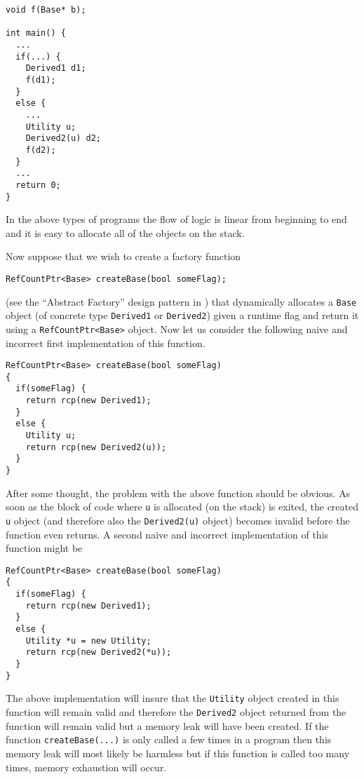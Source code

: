 {\scriptsize\begin{verbatim}
void f(Base* b);

int main() {
  ...
  if(...) {
    Derived1 d1;
    f(d1);
  }
  else {
    ...
    Utility u;
    Derived2(u) d2;
    f(d2);
  }
  ...
  return 0;
}
\end{verbatim}}

{}\noindent{}In the above types of programs the flow of logic is
linear from beginning to end and it is easy to allocate all of the
objects on the stack.

Now suppose that we wish to create a factory function

{\scriptsize\begin{verbatim}
RefCountPtr<Base> createBase(bool someFlag);
\end{verbatim}}

{}\indent{}(see the ``Abstract Factory'' design pattern in
{}\cite{ref:gama_et_al_1995}) that dynamically allocates a
{}\texttt{Base} object (of concrete type {}\texttt{Derived1} or
{}\texttt{Derived2}) given a runtime flag and return it using a
{}\texttt{RefCountPtr<Base>} object.  Now let us consider the
following naive and incorrect first implementation of this function.

{\scriptsize\begin{verbatim}
RefCountPtr<Base> createBase(bool someFlag)
{
  if(someFlag) {
    return rcp(new Derived1);
  }
  else {
    Utility u;
    return rcp(new Derived2(u));
  }
}
\end{verbatim}

}{}\noindent{}After some thought, the problem with the above function
should be obvious.  As soon as the block of code where {}\texttt{u} is
allocated (on the stack) is exited, the created {}\texttt{u} object
(and therefore also the {}\texttt{Derived2(u)} object) becomes invalid
before the function even returns.  A second naive and incorrect
implementation of this function might be

{\scriptsize\begin{verbatim}
RefCountPtr<Base> createBase(bool someFlag)
{
  if(someFlag) {
    return rcp(new Derived1);
  }
  else {
    Utility *u = new Utility;
    return rcp(new Derived2(*u));
  }
}
\end{verbatim}}

{}\noindent{} The above implementation will insure that the
{}\texttt{Utility} object created in this function will remain valid
and therefore the {}\texttt{Derived2} object returned from the
function will remain valid but a memory leak will have been created.
If the function {}\texttt{create\-Base(...)}  is only called a few
times in a program then this memory leak will most likely be harmless
but if this function is called too many times, memory exhaustion will
occur.

